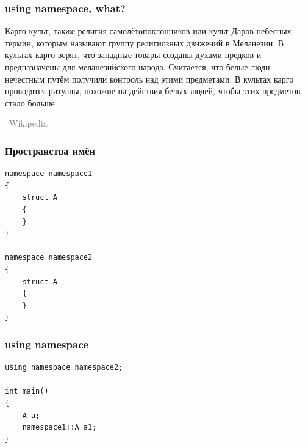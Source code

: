 \documentclass[xetex,mathserif,serif]{beamer}
\newcommand{\attribution}[1] {
\vspace{-5mm}\begin{flushright}\begin{scriptsize}\textcolor{gray}{\textcopyright\, #1}\end{scriptsize}\end{flushright}
}
\begin{document}
	\begin{frame}
		\frametitle{using namespace, what?}
		Карго-культ, также религия самолётопоклонников или культ Даров небесных --- термин, которым называют группу религиозных движений в Меланезии. В культах карго верят, что западные товары созданы духами предков и предназначены для меланезийского народа. Считается, что белые люди нечестным путём получили контроль над этими предметами. В культах карго проводятся ритуалы, похожие на действия белых людей, чтобы этих предметов стало больше.
		\attribution{Wikipedia}
	\end{frame}

	\begin{frame}[fragile]
		\frametitle{Пространства имён}
		\begin{verbatim}
namespace namespace1 
{
    struct A 
    {
    }
}

namespace namespace2 
{
    struct A 
    {
    }
}
		\end{verbatim}
	\end{frame}

	\begin{frame}[fragile]
		\frametitle{using namespace}
		\begin{verbatim}
using namespace namespace2;

int main()
{
    A a;
    namespace1::A a1;
}
		\end{verbatim}
	\end{frame}
\end{document}
